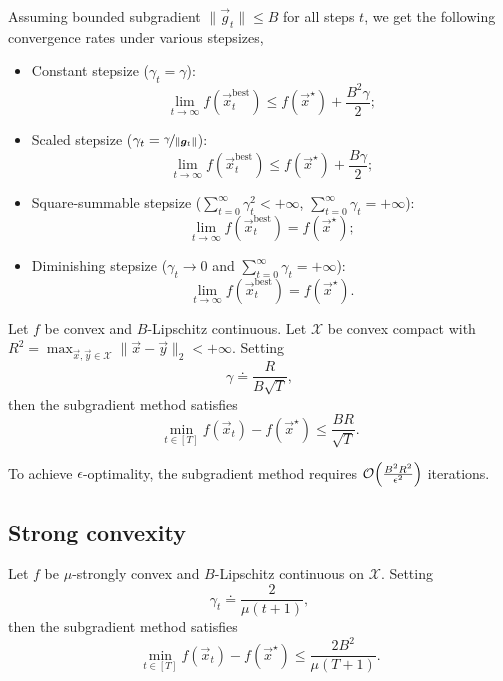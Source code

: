 Assuming bounded subgradient $\| \vec{g}_t \| \leq B$ for all steps $t$, we get the following
convergence rates under various stepsizes,
\begin{itemize}
    \item Constant stepsize ($\gamma_t = \gamma$): \[
              \lim_{t\to \infty} f(\vec{x}_t^{\mathrm{best}}) \leq f(\vec{x}^\star) + \frac{B^2 \gamma}{2};
          \]
    \item Scaled stepsize ($\gamma_t = \nicefrac{\gamma}{\| \vec{g}_t \|}$): \[
              \lim_{t \to \infty} f(\vec{x}_t^{\mathrm{best}}) \leq f(\vec{x}^\star) + \frac{B \gamma}{2};
          \]
    \item Square-summable stepsize ($\sum_{t=0}^{\infty} \gamma_t^2 < +\infty$, $\sum_{t=0}^{\infty} \gamma_t
              = +\infty$): \[
              \lim_{t \to \infty} f(\vec{x}_t^{\mathrm{best}}) = f(\vec{x}^\star);
          \]
    \item Diminishing stepsize ($\gamma_t \to 0$ and $\sum_{t=0}^{\infty} \gamma_t = +\infty$): \[
              \lim_{t \to \infty} f(\vec{x}_t^{\mathrm{best}}) = f(\vec{x}^\star).
          \]
\end{itemize}

\begin{corollary}
    Let $f$ be convex and $B$-Lipschitz continuous. Let $\mathcal{X}$ be convex compact with $R^2 = \max_{\vec{x},\vec{y} \in \mathcal{X}} \| \vec{x} - \vec{y} \|_2 < +\infty$. Setting \[
        \gamma \doteq \frac{R}{B \sqrt{T}},
    \]
    then the subgradient method satisfies \[
        \min_{t \in [T]} f(\vec{x}_t) - f(\vec{x}^\star) \leq \frac{BR}{\sqrt{T}}.
    \]
\end{corollary}

To achieve $\epsilon$-optimality, the subgradient method requires
$\bigo{\frac{B^2R^2}{\epsilon^2}}$ iterations.

\subsection{Strong convexity}

\begin{theorem}
    Let $f$ be $\mu$-strongly convex and $B$-Lipschitz continuous on $\mathcal{X}$. Setting \[
        \gamma_t \doteq \frac{2}{\mu (t+1)},
    \]
    then the subgradient method satisfies \[
        \min_{t \in [T]} f(\vec{x}_t) - f(\vec{x}^\star) \leq \frac{2B^2}{\mu (T+1)}.
    \]
\end{theorem}

